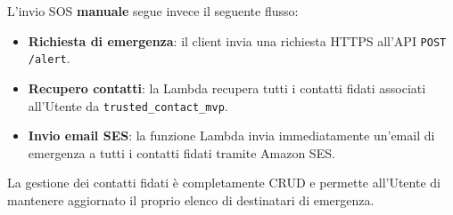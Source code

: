 \documentclass[a4paper,12pt]{article}
\begin{document}
L’invio SOS \textbf{manuale} segue invece il seguente flusso:
\begin{itemize}
    \item \textbf{Richiesta di emergenza}: il client invia una richiesta HTTPS all'API \texttt{POST /alert}.
    
    \item \textbf{Recupero contatti}: la Lambda recupera tutti i contatti fidati associati all’Utente da \texttt{trusted\_contact\_mvp}.
    
    \item \textbf{Invio email SES}: la funzione Lambda invia immediatamente un'email di emergenza a tutti i contatti fidati tramite Amazon SES.
\end{itemize}

La gestione dei contatti fidati è completamente CRUD e permette all’Utente di mantenere aggiornato il proprio elenco di destinatari di emergenza.
\end{document}
